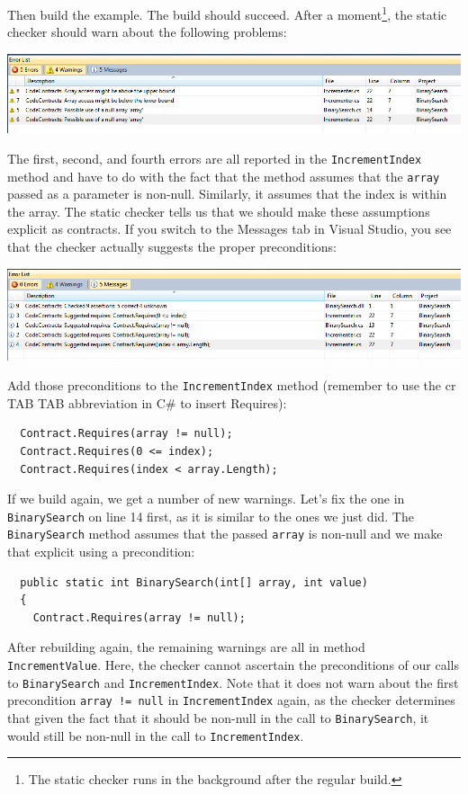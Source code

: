 \documentclass{article}
\newcommand{\code}[1]{\lstinline{#1}}
\begin{document}
Then build the example. The build should succeed. After a
moment\footnote{The static checker runs in the background after the regular build.}, 
the static checker should warn about the
following problems:
\begin{center}
  \includegraphics[width=1\columnwidth]{ex2.png}
\end{center}
The first, second, and fourth errors are all reported in the \code{IncrementIndex} method
and have to do with the fact that the method assumes that the \code{array}
passed as a parameter is non-null. Similarly, it assumes that the index
is within the array. The static checker tells us that we should make
these assumptions explicit as contracts. If you switch to the Messages
tab in Visual Studio, you see that the checker actually
suggests the proper preconditions:
\begin{center}
  \includegraphics[width=1\columnwidth]{ex3.png}
\end{center}
Add those preconditions to the \code{IncrementIndex} method (remember
to use the \textsf{cr TAB TAB} abbreviation in C\# to insert Requires):
\begin{lstlisting}
  Contract.Requires(array != null);
  Contract.Requires(0 <= index);
  Contract.Requires(index < array.Length);
\end{lstlisting}
If we build again, we get a number of new warnings. Let's fix the one
in \code{BinarySearch} on line 14 first, as it is similar to the ones
we just did. The \code{BinarySearch} method assumes that the passed
\code{array} is non-null and we make that explicit using a
precondition:
\begin{lstlisting}
  public static int BinarySearch(int[] array, int value)
  {
    Contract.Requires(array != null);
\end{lstlisting}
After rebuilding again, the remaining warnings are all in method
\code{IncrementValue}. Here, the checker cannot ascertain the
preconditions of our calls to \code{BinarySearch} and
\code{IncrementIndex}. Note that it does not warn about the first
precondition \code{array != null} in \code{IncrementIndex} again, as
the checker determines that given the fact that it should be non-null
in the call to \code{BinarySearch}, it would still be non-null in the
call to \code{IncrementIndex}.
\end{document}

